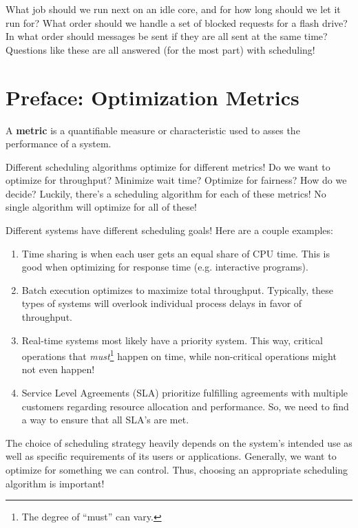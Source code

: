\documentclass{report}
\newcommand{\definitionBegin}[1]{\begin{tcolorbox}[title={Definition: #1}]}
\newcommand{\definitionEnd}{\end{tcolorbox}}
\newcommand{\exampleBegin}[1]{\begin{tcolorbox}[colback=blue!5!white,colframe=black!75!blue,title={Example:
      #1}]}
\newcommand{\exampleEnd}{\end{tcolorbox}}
\begin{document}
\exampleBegin{Who Goes Next?}
What job should we run next on an idle core, and for how long should we let it run for? What order
should we handle a set of blocked requests for a flash drive? In what order should messages be sent
if they are all sent at the same time? Questions like these are all answered (for the most part)
with scheduling!
\exampleEnd





\section*{Preface: Optimization Metrics}
\definitionBegin{Metric}
A \textbf{metric} is a quantifiable measure or characteristic used to asses the performance of a
system.
\definitionEnd

Different scheduling algorithms optimize for different metrics! Do we want to optimize for
throughput? Minimize wait time? Optimize for fairness? How do we decide? Luckily, there's a
scheduling algorithm for each of these metrics! No single algorithm will optimize for all of these!

\exampleBegin{Metric Mania}
Different systems have different scheduling goals! Here are a couple examples:
\begin{enumerate}[label=\textit{(\roman*)}]
\item Time sharing is when each user gets an equal share of CPU time. This is good when optimizing
  for response time (e.g. interactive programs).
\item Batch execution optimizes to maximize total throughput. Typically, these types of systems will
  overlook individual process delays in favor of throughput.
\item Real-time systems most likely have a priority system. This way, critical operations that
  \textit{must}\footnote{The degree of ``must'' can vary.} happen on time, while non-critical
  operations might not even happen!
\item Service Level Agreements (SLA) prioritize fulfilling agreements with multiple customers
  regarding resource allocation and performance. So, we need to find a way to ensure that all SLA's
  are met.
\end{enumerate}
\exampleEnd

The choice of scheduling strategy heavily depends on the system's intended use as well as specific
requirements of its users or applications. Generally, we want to optimize for something we can
control. Thus, choosing an appropriate scheduling algorithm is important!
\end{document}
